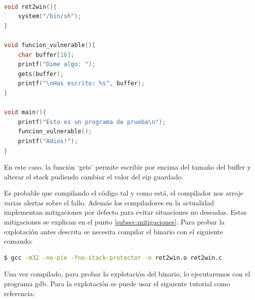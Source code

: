 \begin{lstlisting}[language=C, caption=Código vulnerable con función ret2win]

void ret2win(){
    system("/bin/sh");
}

void funcion_vulnerable(){
    char buffer[16];
    printf("Dime algo: ");
    gets(buffer);
    printf("\nHas escrito: %s", buffer);
}

void main(){
    printf("Esto es un programa de prueba\n");
    funcion_vulnerable();
    printf("Adios!");
}
\end{lstlisting}
\FloatBarrier
En este caso, la función `gets' permite escribir por encima del tamaño del buffer y alterar el stack pudiendo cambiar el valor del \acrshort{eip} guardado.

Es probable que compilando el código tal y como está, el compilador nos arroje varias alertas sobre el fallo. Además los compiladores en la actualidad implementan mitigaciones por defecto para evitar situaciones no deseadas.
Estas mitigaciones se explican en el punto \ref{subsec:mitigaciones}.
Para probar la explotación antes descrita se necesita compilar el binario con el siguiente comando:
\begin{lstlisting}[language=bash, caption=Compilado de código con pocas mitigaciones y arquitectura 32bit]
$ gcc -m32 -no-pie -fno-stack-protector -o ret2win.o ret2win.c
\end{lstlisting}
Una vez compilado, para probar la explotación del binario, lo ejecutaremos con el programa \acrfull{gdb}.
Para la explotación se puede usar el siguiente tutorial como referencia:
